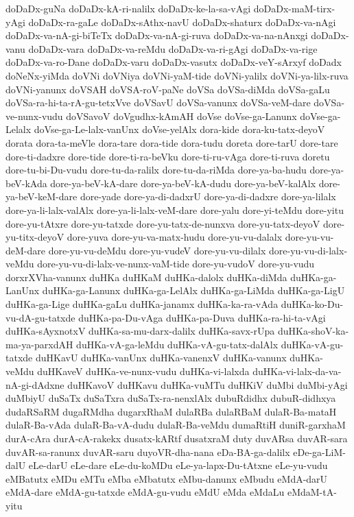 {doDaDx-guNa
doDaDx-kA-ri-nalilx
doDaDx-ke-la-sa-vAgi
doDaDx-maM-tirx-yAgi
doDaDx-ra-gaLe
doDaDx-sAthx-navU
doDaDx-shaturx
doDaDx-va-nAgi
doDaDx-va-nA-gi-biTeTx
doDaDx-va-nA-gi-ruva
doDaDx-va-na-nAnxgi
doDaDx-vanu
doDaDx-vara
doDaDx-va-reMdu
doDaDx-va-ri-gAgi
doDaDx-va-rige
doDaDx-va-ro-Dane
doDaDx-varu
doDaDx-vasutx
doDaDx-veY-sArxyf
doDadx
doNeNx-yiMda
doVNi
doVNiya
doVNi-yaM-tide
doVNi-yalilx
doVNi-ya-lilx-ruva
doVNi-yanunx
doVSAH
doVSA-roV-paNe
doVSa
doVSa-diMda
doVSa-gaLu
doVSa-ra-hi-ta-rA-gu-tetxVve
doVSavU
doVSa-vanunx
doVSa-veM-dare
doVSa-ve-nunx-vudu
doVSavoV
doVgudhx-kAmAH
doVse
doVse-ga-Lanunx
doVse-ga-Lelalx
doVse-ga-Le-lalx-vanUnx
doVse-yelAlx
dora-kide
dora-ku-tatx-deyoV
dorata
dora-ta-meVle
dora-tare
dora-tide
dora-tudu
doreta
dore-tarU
dore-tare
dore-ti-dadxre
dore-tide
dore-ti-ra-beVku
dore-ti-ru-vAga
dore-ti-ruva
doretu
dore-tu-bi-Du-vudu
dore-tu-da-ralilx
dore-tu-da-riMda
dore-ya-ba-hudu
dore-ya-beV-kAda
dore-ya-beV-kA-dare
dore-ya-beV-kA-dudu
dore-ya-beV-kalAlx
dore-ya-beV-keM-dare
dore-yade
dore-ya-di-dadxrU
dore-ya-di-dadxre
dore-ya-lilalx
dore-ya-li-lalx-valAlx
dore-ya-li-lalx-veM-dare
dore-yalu
dore-yi-teMdu
dore-yitu
dore-yu-tAtxre
dore-yu-tatxde
dore-yu-tatx-de-nunxva
dore-yu-tatx-deyoV
dore-yu-titx-deyoV
dore-yuva
dore-yu-va-matx-hudu
dore-yu-vu-dalalx
dore-yu-vu-deM-dare
dore-yu-vu-deMdu
dore-yu-vudeV
dore-yu-vu-dilalx
dore-yu-vu-di-lalx-veMdu
dore-yu-vu-di-lalx-ve-nunx-vaM-tide
dore-yu-vudoV
dore-yu-vudu
dorxrXVha-vanunx
duHKa
duHKaM
duHKa-dalolx
duHKa-diMda
duHKa-ga-LanUnx
duHKa-ga-Lanunx
duHKa-ga-LelAlx
duHKa-ga-LiMda
duHKa-ga-LigU
duHKa-ga-Lige
duHKa-gaLu
duHKa-janamx
duHKa-ka-ra-vAda
duHKa-ko-Du-vu-dA-gu-tatxde
duHKa-pa-Du-vAga
duHKa-pa-Duva
duHKa-ra-hi-ta-vAgi
duHKa-sAyxnotxV
duHKa-sa-mu-darx-dalilx
duHKa-savx-rUpa
duHKa-shoV-ka-ma-ya-parxdAH
duHKa-vA-ga-leMdu
duHKa-vA-gu-tatx-dalAlx
duHKa-vA-gu-tatxde
duHKavU
duHKa-vanUnx
duHKa-vanenxV
duHKa-vanunx
duHKa-veMdu
duHKaveV
duHKa-ve-nunx-vudu
duHKa-vi-lalxda
duHKa-vi-lalx-da-va-nA-gi-dAdxne
duHKavoV
duHKavu
duHKa-vuMTu
duHKiV
duMbi
duMbi-yAgi
duMbiyU
duSaTx
duSaTxra
duSaTx-ra-nenxlAlx
dubuRdidhx
dubuR-didhxya
dudaRSaRM
dugaRMdha
dugarxRhaM
dulaRBa
dulaRBaM
dulaR-Ba-mataH
dulaR-Ba-vAda
dulaR-Ba-vA-dudu
dulaR-Ba-veMdu
dumaRtiH
duniR-garxhaM
durA-cAra
durA-cA-rakekx
dusatx-kARtf
dusatxraM
duty
duvARsa
duvAR-sara
duvAR-sa-ranunx
duvAR-saru
duyoVR-dha-nana
eDa-BA-ga-dalilx
eDe-ga-LiM-dalU
eLe-darU
eLe-dare
eLe-du-koMDu
eLe-ya-lapx-Du-tAtxne
eLe-yu-vudu
eMBatutx
eMDu
eMTu
eMba
eMbatutx
eMbu-danunx
eMbudu
eMdA-darU
eMdA-dare
eMdA-gu-tatxde
eMdA-gu-vudu
eMdU
eMda
eMdaLu
eMdaM-tA-yitu
}
